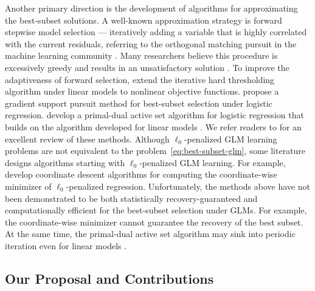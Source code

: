 Another primary direction is the development of algorithms for approximating the best-subset solutions.
A well-known approximation strategy is forward stepwise model selection --- iteratively adding a variable that is highly correlated with the current residuals,
referring to the orthogonal matching pursuit in the machine learning community \citep{mallet1993omp, lozano2011gomp}.
Many researchers believe this procedure is excessively greedy and results in an unsatisfactory solution \citep {weisberg2005applied, friedman2009elements}.
To improve the adaptiveness of forward selection,
\citet{blumensathCompressedSensingNonlinear2013} extend
the iterative hard thresholding algorithm under linear models \citep{blumensathIterativeHardThresholding2009}
to nonlinear objective functions.
\citet{bahmaniGreedySparsityconstrainedOptimization2013}
propose a gradient support pursuit method for best-subset selection under logistic regression.
\citet{wen2017bess} develop a primal-dual active set algorithm for logistic regression that builds on the algorithm developed for linear models \citep{huang2017constructive}.
We refer readers to \citet{zhouGlobalQuadraticConvergence2021} for an excellent review of these methods.
Although $\ell_0$-penalized GLM learning problems are not equivalent to the problem~\eqref{eq:best-subset-glm},
some literature designs algorithms starting with $\ell_0$-penalized GLM learning.
For example, \citet{beckSparsityConstrainedNonlinear2013, antoine2021l0learn} develop coordinate descent algorithms for computing the coordinate-wise minimizer of $\ell_0$-penalized regression.
Unfortunately, the methods above have not been demonstrated to be both statistically recovery-guaranteed and computationally efficient for the best-subset selection under GLMs.
For example, the coordinate-wise minimizer cannot guarantee the recovery of the best subset. At the same time, the primal-dual active set algorithm may sink into periodic iteration even for linear models \citep{foucartHardThresholdingPursuit2011}.


\subsection{Our Proposal and Contributions}

